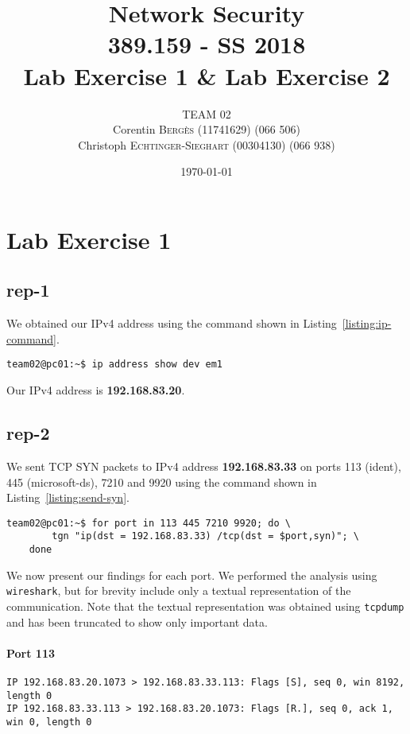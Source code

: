 \documentclass{article}
\title{Network Security \\ 389.159 - SS 2018 \\ Lab Exercise 1 \& Lab Exercise 2} %
\author{
    TEAM 02 \\
    Corentin \textsc{Bergès} (11741629) (066 506) \\
    Christoph \textsc{Echtinger-Sieghart} (00304130) (066 938)
}
\date{\today} %
\begin{document}
\maketitle %

\renewcommand{\arraystretch}{2} %
\section{Lab Exercise 1}

\subsection{rep-1}

We obtained our IPv4 address using the command shown in Listing~\ref{listing:ip-command}.

\begin{lstlisting}[label=listing:ip-command,caption={Command used to obtain IP address}]
team02@pc01:~$ ip address show dev em1
\end{lstlisting}

Our IPv4 address is \textbf{192.168.83.20}.

\subsection{rep-2}

We sent TCP SYN packets to IPv4 address \textbf{192.168.83.33} on ports 113 (ident), 445 (microsoft-ds),
7210 and 9920 using the command shown in Listing~\ref{listing:send-syn}.

\begin{lstlisting}[label=listing:send-syn,caption={Command used to send the SYN packets}]
team02@pc01:~$ for port in 113 445 7210 9920; do \
        tgn "ip(dst = 192.168.83.33) /tcp(dst = $port,syn)"; \
    done
\end{lstlisting}

We now present our findings for each port. We performed the analysis using \texttt{wireshark}, but for
brevity include only a textual representation of the communication. Note that the textual representation was
obtained using \texttt{tcpdump} and has been truncated to show only important data.

\paragraph{Port 113}
\begin{Verbatim}
IP 192.168.83.20.1073 > 192.168.83.33.113: Flags [S], seq 0, win 8192, length 0
IP 192.168.83.33.113 > 192.168.83.20.1073: Flags [R.], seq 0, ack 1, win 0, length 0
\end{Verbatim}
\end{document}
